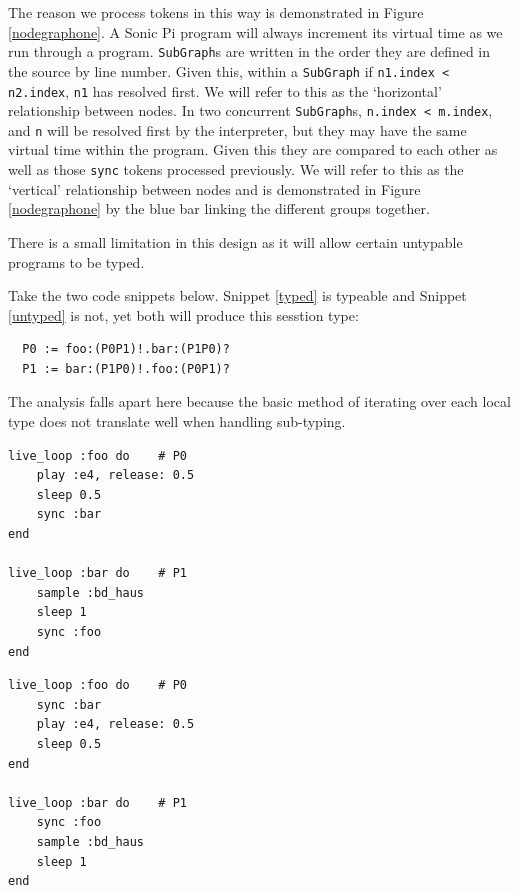 \documentclass[11pt, abstracton, twoside, titlepage=true]{scrartcl}
\begin{document}
The reason we process tokens in this way is demonstrated in Figure 
\ref{nodegraphone}. A Sonic Pi program will always increment its virtual 
time as we run through a program. \texttt{SubGraph}s are written in the order 
they are defined in the source by line number. Given this, within a 
\texttt{SubGraph} if \texttt{n1.index < n2.index}, \texttt{n1} has resolved 
first. We will refer to this as the `horizontal' relationship 
between nodes. In two concurrent \texttt{SubGraph}s, \texttt{n.index < m.index}, 
and \texttt{n} will be resolved first by the interpreter, but they may have the 
same virtual time within the program. Given this they are compared to each other as 
well as those \texttt{sync} tokens processed previously. We will refer to this as 
the `vertical' relationship between nodes and is demonstrated in Figure 
\ref{nodegraphone} by the blue bar linking the different groups together.



There is a small limitation in this design as it will allow certain untypable
programs to be typed.

Take the two code snippets below. Snippet \ref{typed} is typeable and Snippet 
\ref{untyped} is not, yet both will produce this sesstion type:
\\
\begin{lstlisting}
  P0 := foo:(P0P1)!.bar:(P1P0)?
  P1 := bar:(P1P0)!.foo:(P0P1)?
\end{lstlisting}

The analysis falls apart here because the basic method of iterating over each local 
type does not translate well when handling sub-typing.

\begin{multicols}{2} 
	\begin{minipage}{0.4\textwidth}
		\begin{lstlisting}[style = sonicpi]
live_loop :foo do    # P0
    play :e4, release: 0.5
    sleep 0.5
    sync :bar
end

live_loop :bar do    # P1
    sample :bd_haus
    sleep 1
    sync :foo
end
		\end{lstlisting}
		 \label{untyped}
	\end{minipage} \hspace{35pt}
	\begin{minipage}{0.4\textwidth}
		\begin{lstlisting}[style = sonicpi]
live_loop :foo do    # P0
    sync :bar
    play :e4, release: 0.5
    sleep 0.5
end

live_loop :bar do    # P1
    sync :foo
    sample :bd_haus
    sleep 1
end
		\end{lstlisting}
		 \label{typed}
	\end{minipage}
\end{multicols}
\newpage
\end{document}
